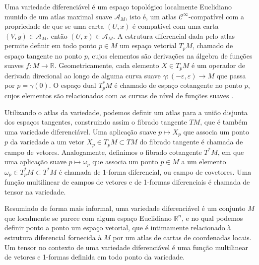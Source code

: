 Uma variedade diferenciável  é um espaço topológico  localmente Euclidiano munido de um atlas maximal suave \(\mathscr{A}_M\), isto é, um atlas \(\mathcal{C}^\infty\)-compatível com a propriedade de que se uma carta \((U,x)\) é compatível com uma carta \((V,y) \in \mathscr{A}_M\), então \((U,x) \in \mathscr{A}_M\). A estrutura diferencial dada pelo atlas permite definir em todo ponto \(p \in M\) um espaço vetorial \(T_pM\), chamado de espaço tangente no ponto \(p\), cujos elementos são derivações na álgebra  de funções suaves \(f : M \to \mathbb{R}\). Geometricamente, cada elemento \(X \in T_pM\) é um operador de derivada direcional ao longo de alguma curva suave \(\gamma : (-\varepsilon, \varepsilon) \to M\) que passa por \(p = \gamma(0)\). O espaço dual \(T^{\ast}_pM\) é chamado de espaço cotangente no ponto \(p\), cujos elementos são relacionados com as curvas de nível de funções suaves .

Utilizando o atlas da variedade, podemos definir um atlas para a união disjunta dos espaços tangentes, construindo assim o fibrado tangente \(TM\), que é também uma variedade diferenciável. Uma aplicação suave \(p \mapsto X_p\) que associa um ponto \(p\) da variedade a um vetor \(X_p \in T_pM \subset TM\) do fibrado tangente é chamada de campo de vetores. Analogamente, definimos o fibrado cotangente \(T ^{\ast}M\), em que uma aplicação suave \(p \mapsto \omega_p\) que associa um ponto \(p \in M\) a um elemento \(\omega_p \in T_p ^{\ast}M \subset T ^{\ast}M\) é chamada de 1-forma diferencial, ou campo de covetores. Uma função multilinear de campos de vetores e de 1-formas diferenciais é chamada de tensor na variedade.

Resumindo de forma mais informal, uma variedade diferenciável é um conjunto \(M\) que localmente se parece com algum espaço Euclidiano \(\mathbb{R}^n\), e no qual podemos definir ponto a ponto um espaço vetorial, que é intimamente relacionado à estrutura diferencial fornecida à \(M\) por um atlas de cartas de coordenadas locais. Um tensor no contexto de uma variedade diferenciável é uma função multilinear de vetores e 1-formas definida em todo ponto da variedade.
